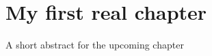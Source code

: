 \chapter{My first real chapter}
\label{chap:intro}
\begin{shortAbstract}
A short abstract for the upcoming chapter
\end{shortAbstract}